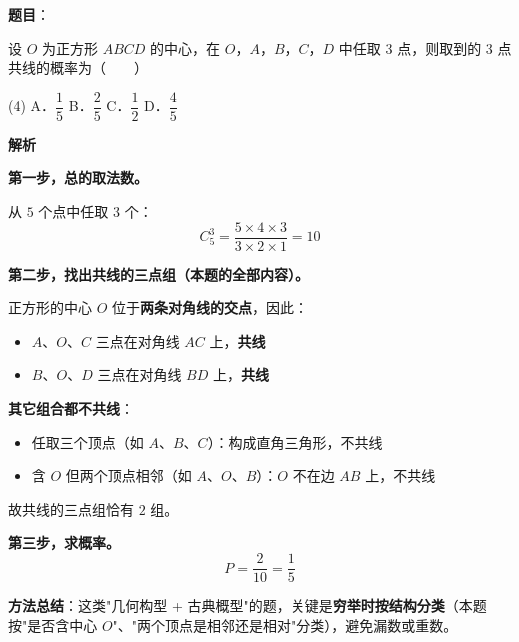 \begin{answer}

\textbf{题目}：

设 $O$ 为正方形 $ABCD$ 的中心，在 $O$，$A$，$B$，$C$，$D$ 中任取 $3$ 点，则取到的 $3$ 点共线的概率为\mbox{（　　）}

\begin{gkopts}(4)
\task A．$\dfrac15$
\task B．$\dfrac25$
\task C．$\dfrac12$
\task D．$\dfrac45$
\end{gkopts}

\Needspace{0.6\textheight}

\textbf{解析}

\textbf{第一步，总的取法数。}

从 $5$ 个点中任取 $3$ 个：
\nopagebreak[4]
\[C_5^{3}=\frac{5\times4\times3}{3\times2\times1}=10\]

\textbf{第二步，找出共线的三点组（本题的全部内容）。}

正方形的中心 $O$ 位于\textbf{两条对角线的交点}，因此：
\begin{itemize}
\item $A$、$O$、$C$ 三点在对角线 $AC$ 上，\textbf{共线} 
\item $B$、$O$、$D$ 三点在对角线 $BD$ 上，\textbf{共线} 
\end{itemize}

\textbf{其它组合都不共线}：
\begin{itemize}
\item 任取三个顶点（如 $A$、$B$、$C$）：构成直角三角形，不共线
\item 含 $O$ 但两个顶点相邻（如 $A$、$O$、$B$）：$O$ 不在边 $AB$ 上，不共线
\end{itemize}

故共线的三点组恰有 $2$ 组。

\textbf{第三步，求概率。}
\nopagebreak[4]
\[P=\frac2{10}=\frac15\]

\begin{gktip}
\textbf{方法总结}：这类"几何构型 + 古典概型"的题，关键是\textbf{穷举时按结构分类}（本题按"是否含中心 $O$"、"两个顶点是相邻还是相对"分类），避免漏数或重数。
\end{gktip}


\par\medskip

\end{answer}
